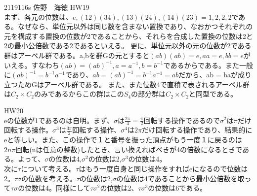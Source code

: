 \documentclass[11pt]{jsarticle}
\begin{document}
2119116s 佐野　海徳
HW19 \\
まず、各元の位数は、${e,(12)(34),(13)(24),(14)(23)} = {1,2,2,2}$である。なぜなら、単位元以外は同じ数を含まない置換であり、なおかつそれぞれの元を構成する置換の位数が2であることから、それらを合成した置換の位数は2と2の最小公倍数である2であるといえる。
更に、単位元以外の元の位数が2である群はアーベル群である。a,bを群Gの元とすると$(ab)(ab) = e, aa = e,bb = e$がいえる。すなわち$(ab) = (ab)^{-1},a = a^{-1},b = b^{-1}$であるからである。また一般に$(ab)^{-1} = b^{-1}a^{-1}$であり、$ab = (ab)^{-1} = b^{-1}a^{-1} = ab$だから、ab = baが成り立つためGはアーベル群である。
また、また位数4で直積で表されるアーベル群は$C_2 \times C_2$のみであるからこの群はこの$S_4$の部分群は$C_2 \times C_2$と同型である。

HW20\\
eの位数が1であるのは自明。まず、$\sigma$は$\frac{2\pi}{4} = \frac{\pi}{2}$回転する操作であるので$\sigma^2$は$\pi$だけ回転する操作。$\sigma^3$は$\frac{3\pi}{2}$回転する操作、$\sigma^4$は$2\pi$だけ回転する操作であり、結果的にeと等しい。また、この操作で１と番号を振った頂点がもう一度１に戻るのは
$2n\pi$回転(nは任意の整数)したとき、言い換えればべきが4の倍数になるときである。よって、$\sigma$の位数は4,$\sigma^2$の位数は2,$\sigma^3$の位数は4。\\
次に$\tau$について考える。$\tau$はもう一度自身と同じ操作をすればeになるので位数は2。$\tau\sigma$の位数を考える。$\tau$の位数は2,$\sigma$の位数は4であることから最小公倍数を取って$\tau\sigma$の位数は4。同様にして$\tau\sigma^2$の位数は2、$\tau\sigma^3$の位数は6である。
\end{document}
